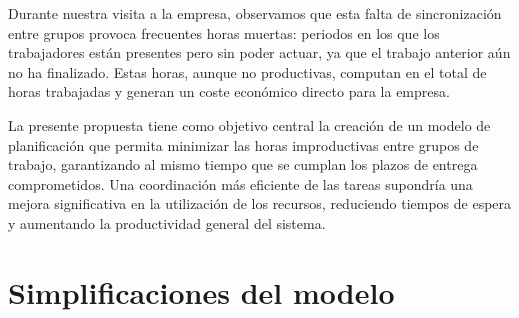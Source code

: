 Durante nuestra visita a la empresa, observamos que esta falta de sincronización entre grupos provoca frecuentes horas muertas: periodos en los que los trabajadores están presentes pero sin poder actuar,
ya que el trabajo anterior aún no ha finalizado. Estas horas, aunque no productivas, computan en el total de horas trabajadas y generan un coste económico directo para la empresa.

La presente propuesta tiene como objetivo central la creación de un modelo de planificación que permita minimizar las horas improductivas entre grupos de trabajo,
garantizando al mismo tiempo que se cumplan los plazos de entrega comprometidos. Una coordinación más eficiente de las tareas supondría una mejora significativa en la utilización de los recursos,
reduciendo tiempos de espera y aumentando la productividad general del sistema.

\section*{Simplificaciones del modelo}

